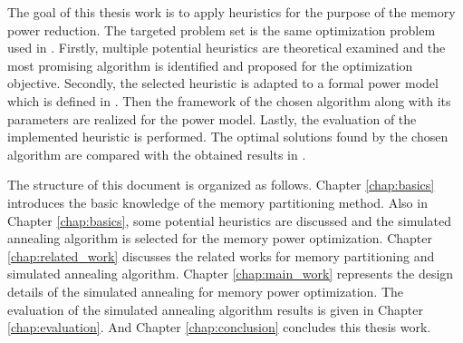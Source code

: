 	The goal of this thesis work is to apply heuristics for the purpose of the memory power reduction. The targeted problem set is the same
	optimization problem used in \cite{Strobel2016}.
	Firstly, multiple potential heuristics are theoretical examined and the most promising algorithm is identified and proposed for the optimization objective.
	Secondly, the selected heuristic is adapted to a formal power model which is defined in \cite{Strobel2016}.
	Then the framework of the chosen algorithm along with its parameters are realized for the power model.
	Lastly, the evaluation of the implemented heuristic is performed. The optimal solutions found by the chosen algorithm are compared with the
	obtained results in \cite{Strobel2016}.
	
	The structure of this document is organized as follows.
	Chapter \ref{chap:basics} introduces the basic knowledge of the memory partitioning method. Also in Chapter \ref{chap:basics}, some potential heuristics are discussed and the simulated annealing algorithm is selected for the memory power optimization.
	Chapter \ref{chap:related_work} discusses the related works for memory partitioning and simulated annealing algorithm.
	Chapter \ref{chap:main_work} represents the design details of the simulated annealing for memory power optimization.
	The evaluation of the simulated annealing algorithm results is given in Chapter \ref{chap:evaluation}.
	And Chapter \ref{chap:conclusion} concludes this thesis work.


